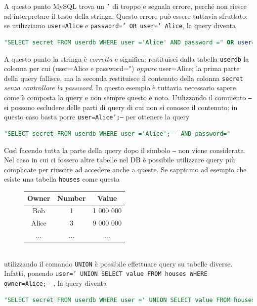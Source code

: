 A questo punto MySQL trova un \texttt{'} di troppo e segnala errore, perché non riesce ad interpretare il testo della stringa. Questo errore può essere tuttavia sfruttato: se utilizziamo \texttt{user=Alice} e \texttt{password=' OR user=' Alice}, la query diventa
\begin{lstlisting}[language=sql]
"SELECT secret FROM userdb WHERE user ='Alice' AND password =" OR user='Alice'
\end{lstlisting}
A questo punto la stringa è \textit{corretta} e significa: restituisci dalla tabella \texttt{userdb} la colonna per cui (user=Alice e password=") \textit{oppure} user=Alice; la prima parte della query fallisce, ma la seconda restituisce il contenuto della colonna \texttt{secret} \textit{senza controllare la password}. In questo esempio è tuttavia necessario sapere come è composta la query e non sempre questo è noto. Utilizzando il commento \texttt{--} si possono escludere delle parti di query di cui non si conosce il contenuto; in questo caso basta porre \texttt{user=Alice';--} per ottenere la query
\begin{lstlisting}[language=sql]
"SELECT secret FROM userdb WHERE user ='Alice';-- AND password="
\end{lstlisting}
Così facendo tutta la parte della query dopo il simbolo \texttt{--} non viene considerata. Nel caso in cui ci fossero altre tabelle nel DB è possibile utilizzare query più complicate per riuscire ad accedere anche a queste. Se sappiamo ad esempio che esiste una tabella \texttt{houses} come questa
\begin{figure}[htbp]
	\centering
	\begin{tabular}{|c|c|c|}
		\hline
		\textbf{Owner} & \textbf{Number} & \textbf{Value} \\
		\hline
		Bob & 1 & 1 000 000 \\
		\hline
		Alice & 3 & 9 000 000 \\
		\hline
		$\dots$ & $\dots$ & $\dots$ \\
		\hline
	\end{tabular}
\end{figure}\\
utilizzando il comando \texttt{UNION} è possibile effettuare query su tabelle diverse. Infatti, ponendo \texttt{user=' UNION SELECT value FROM houses WHERE owner=Alice;-- }, la query diventa
\begin{lstlisting}[language=sql,basicstyle=\scriptsize\ttfamily]
"SELECT secret FROM userdb WHERE user =' UNION SELECT value FROM houses WHERE owner=Alice;-- "
\end{lstlisting}
